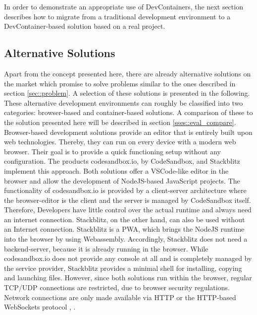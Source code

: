     In order to demonstrate an appropriate use of DevContainers, the next section describes how to migrate from a traditional development environment to a DevContainer-based solution based on a real project.

\subsection{Alternative Solutions}\label{ssec::alternatives}
Apart from the concept presented here, there are already alternative solutions on the market which promise to solve problems similar to the ones described in section \ref{sec::problem}. A selection of these solutions is presented in the following. These alternative development environments can roughly be classified into two categories: browser-based and container-based solutions. A comparison of these to the solution presented here will be described in section \ref{sses::eval_compare}.
Browser-based development solutions provide an editor that is entirely built upon web technologies. Thereby, they can run on every device with a modern web browser. Their goal is to provide a quick functioning setup without any configuration.\newline
The products codesandbox.io, by CodeSandbox, and Stackblitz implement this approach. Both solutions offer a \ac{VSCode}-like editor in the browser and allow the development of NodeJS-based JavaScript projects. The functionality of codesandbox.io is provided by a client-server architecture where the browser-editor is the client and the server is managed by CodeSandbox itself. Therefore, Developers have little control over the actual runtime and always need an internet connection. Stackblitz, on the other hand, can also be used without an Internet connection. Stackblitz is a \ac{PWA}, which brings the NodeJS runtime into the browser by using Webassembly. Accordingly, Stackblitz does not need a backend-server, because it is already running in the browser. While codesandbox.io does not provide any console at all and is completely managed by the service provider, Stackblitz provides a minimal shell for installing, copying and launching files. However, since both solutions run within the browser, regular TCP/UDP connections are restricted, due to browser security regulations.  Network connections are only made available via HTTP or the HTTP-based WebSockets protocol \cite{codesandbox}, \cite{stackblitz}.

